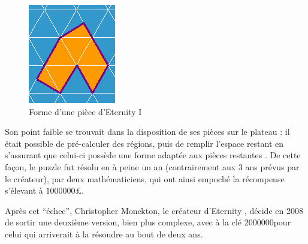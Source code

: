 \begin{figure}[H]
		\includegraphics[width=\linewidth]{images/eternity_1_piece.jpg}
		\caption{Forme d'une pièce d'Eternity I} \label{fig:eternity_1_piece}
		\endminipage\hfill
	\end{figure}

	Son point faible se trouvait dans la disposition de ses pièces sur le plateau : il était possible de pré-calculer des régions, puis de remplir l'espace restant en s'assurant que celui-ci possède une forme adaptée aux pièces restantes \cite{resolutioneternity}.
	De cette façon, le puzzle fut résolu en à peine un an (contrairement aux 3 ans prévus par le créateur), par deux mathématiciens, qui ont ainsi empoché la récompense s'élevant à $1000000$\pounds.
	
	Après cet \enquote{échec}, Christopher Monckton, le créateur d'Eternity \cite{eternity2maker}, décide en 2008 de sortir une deuxième version, bien plus complexe, avec à la clé $2000000$\textdollar pour celui qui arriverait à la résoudre au bout de deux ans.
	
